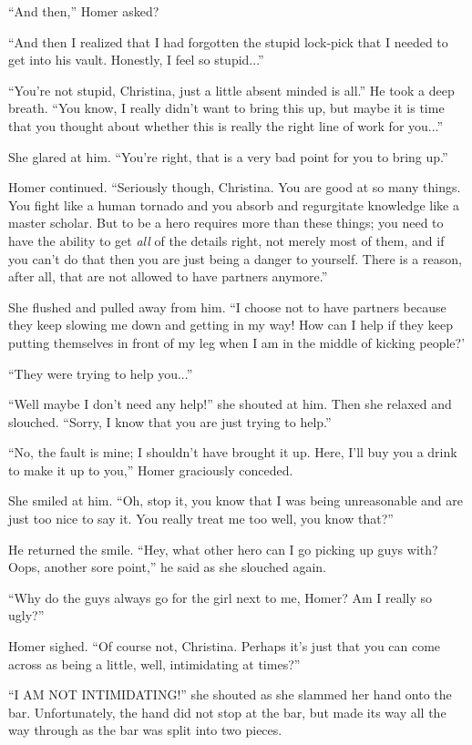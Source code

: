 \documentclass[showtrims,b6paper,draft,10pt]{memoir}
\begin{document}
``And then,''  Homer asked?

``And then I realized that I had forgotten the stupid lock-pick that I needed to get into his vault.  Honestly, I feel so stupid...''

``You're not stupid, Christina, just a little absent minded is all.''  He took a deep breath.  ``You know, I really didn't want to bring this up, but maybe it is time that you thought about whether this is really the right line of work for you...''

She glared at him.  ``You're right, that is a very bad point for you to bring up.''

Homer continued.  ``Seriously though, Christina.  You are good at so many things.  You fight like a human tornado and you absorb and regurgitate knowledge like a master scholar.  But to be a hero requires more than these things;  you need to have the ability to get \emph{all} of the details right, not merely most of them, and if you can't do that then you are just being a danger to yourself.  There is a reason, after all, that are not allowed to have partners anymore.''

She flushed and pulled away from him.  ``I choose not to have partners because they keep slowing me down and getting in my way!  How can I help if they keep putting themselves in front of my leg when I am in the middle of kicking people?'

``They were trying to help you...''

``Well maybe I don't need any help!'' she shouted at him.  Then she relaxed and slouched.  ``Sorry, I know that you are just trying to help.''

``No, the fault is mine;  I shouldn't have brought it up.  Here, I'll buy you a drink to make it up to you,'' Homer graciously conceded.

She smiled at him.  ``Oh, stop it, you know that I was being unreasonable and are just too nice to say it.  You really treat me too well, you know that?''

He returned the smile.  ``Hey, what other hero can I go picking up guys with?  Oops, another sore point,'' he said as she slouched again.

``Why do the guys always go for the girl next to me, Homer?  Am I really so ugly?''

Homer sighed.  ``Of course not, Christina.  Perhaps it's just that you can come across as being a little, well, intimidating at times?''

``I AM NOT INTIMIDATING!''  she shouted as she slammed her hand onto the bar.  Unfortunately, the hand did not stop at the bar, but made its way all the way through as the bar was split into two pieces.
\end{document}

